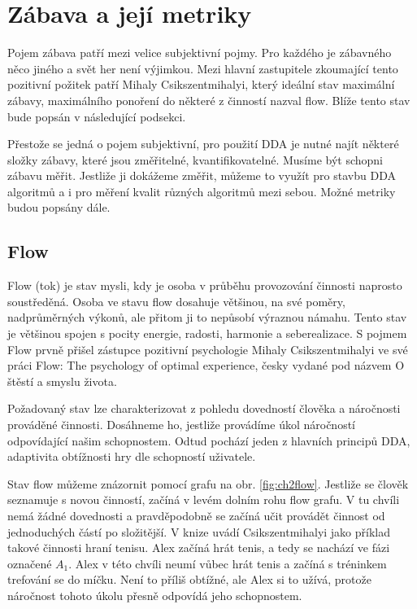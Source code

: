 \chapter{Zábava a její metriky}

Pojem zábava patří mezi velice subjektivní pojmy. Pro každého je zábavného něco jiného a svět her není výjimkou. Mezi hlavní zastupitele zkoumající tento pozitivní požitek patří Mihaly Csikszentmihalyi, který ideální stav maximální zábavy, maximálního ponoření do některé z činností nazval flow. Blíže tento stav bude popsán v následující podsekci.

Přestože se jedná o pojem subjektivní, pro použití DDA je nutné najít některé složky zábavy, které jsou změřitelné, kvantifikovatelné. Musíme být schopni zábavu měřit. Jestliže ji dokážeme změřit, můžeme to využít pro stavbu DDA algoritmů a i pro měření kvalit různých algoritmů mezi sebou. Možné metriky budou popsány dále.

\section{Flow}

Flow (tok) je stav mysli, kdy je osoba v průběhu provozování činnosti naprosto soustředěná. Osoba ve stavu flow dosahuje většinou, na své poměry, nadprůměrných výkonů, ale přitom ji to nepůsobí výraznou námahu. Tento stav je většinou spojen s pocity energie, radosti, harmonie a seberealizace\cite{FlowCZ}. S pojmem Flow prvně přišel zástupce pozitivní psychologie Mihaly Csikszentmihalyi ve své práci Flow: The psychology of optimal experience, česky vydané pod názvem O štěstí a smyslu života\cite{stesti}.

Požadovaný stav lze charakterizovat z pohledu dovedností člověka a náročnosti prováděné činnosti. Dosáhneme ho, jestliže provádíme úkol náročností odpovídající našim schopnostem. Odtud pochází jeden z hlavních principů DDA, adaptivita obtížnosti hry dle schopností uživatele.

Stav flow můžeme znázornit pomocí grafu na obr. \ref{fig:ch2flow}. Jestliže se člověk seznamuje s novou činností, začíná v levém dolním rohu flow grafu. V tu chvíli nemá žádné dovednosti a pravděpodobně se začíná učit provádět činnost od jednoduchých částí po složitější. V knize \cite{OptimalFun} uvádí Csikszentmihalyi jako příklad takové činnosti hraní tenisu. Alex začíná hrát tenis, a tedy se nachází ve fázi označené $A_1$. Alex v této chvíli neumí vůbec hrát tenis a začíná s tréninkem trefování se do míčku. Není to příliš obtížné, ale Alex si to užívá, protože náročnost tohoto úkolu přesně odpovídá jeho schopnostem.

